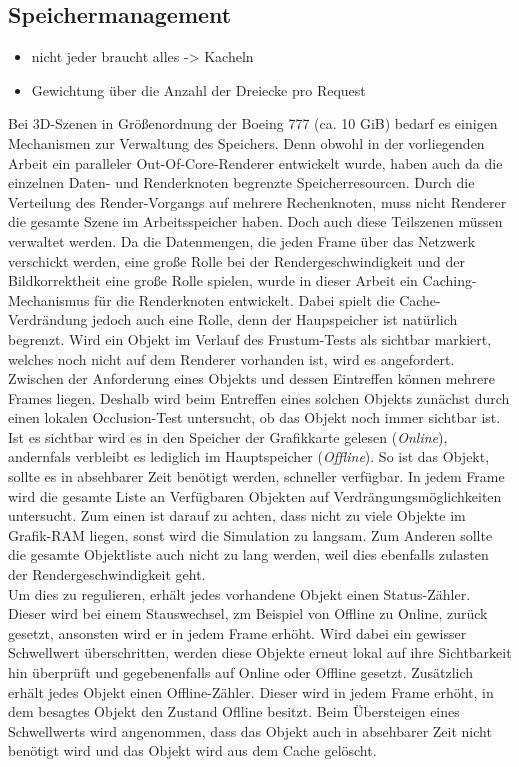 \subsection{Speichermanagement}
\label{sec:basics:speicher}
\begin{itemize}
 \item nicht jeder braucht alles -> Kacheln
 \item Gewichtung über die Anzahl der Dreiecke pro Request
\end{itemize}
Bei 3D-Szenen in Größenordnung der Boeing 777 (ca. 10 GiB) bedarf es einigen Mechanismen zur Verwaltung des Speichers. Denn obwohl in der vorliegenden Arbeit ein paralleler Out-Of-Core-Renderer entwickelt wurde, haben auch da die einzelnen Daten- und Renderknoten begrenzte Speicherresourcen. Durch die Verteilung des Render-Vorgangs auf mehrere Rechenknoten, muss nicht Renderer die gesamte Szene im Arbeitsspeicher haben. Doch auch diese Teilszenen müssen verwaltet werden. Da die Datenmengen, die jeden Frame über das Netzwerk verschickt werden, eine große Rolle bei der Rendergeschwindigkeit und der Bildkorrektheit eine große Rolle spielen, wurde in dieser Arbeit ein Caching-Mechanismus für die Renderknoten entwickelt. Dabei spielt die Cache-Verdrändung jedoch auch eine Rolle, denn der Haupspeicher ist natürlich begrenzt. Wird ein Objekt im Verlauf des Frustum-Tests als sichtbar markiert, welches noch nicht auf dem Renderer vorhanden ist, wird es angefordert. Zwischen der Anforderung eines Objekts und dessen Eintreffen können mehrere Frames liegen. Deshalb wird beim Entreffen eines solchen Objekts zunächst durch einen lokalen Occlusion-Test untersucht, ob das Objekt noch immer sichtbar ist. Ist es sichtbar wird es in den Speicher der Grafikkarte gelesen (\textit{Online}), andernfals verbleibt es lediglich im Hauptspeicher (\textit{Offline}). So ist das Objekt, sollte es in absehbarer Zeit benötigt werden, schneller verfügbar. In jedem Frame wird die gesamte Liste an Verfügbaren Objekten auf Verdrängungsmöglichkeiten untersucht. Zum einen ist darauf zu achten, dass nicht zu viele Objekte im Grafik-RAM liegen, sonst wird die Simulation zu langsam. Zum Anderen sollte die gesamte Objektliste auch nicht zu lang werden, weil dies ebenfalls zulasten der Rendergeschwindigkeit geht.\\
Um dies zu regulieren, erhält jedes vorhandene Objekt einen Status-Zähler. Dieser wird bei einem Stauswechsel, zm Beispiel von Offline zu Online, zurück gesetzt, ansonsten wird er in jedem Frame erhöht. Wird dabei ein gewisser Schwellwert überschritten, werden diese Objekte erneut lokal auf ihre Sichtbarkeit hin überprüft und gegebenenfalls auf Online oder Offline gesetzt. Zusätzlich erhält jedes Objekt einen Offline-Zähler. Dieser wird in jedem Frame erhöht, in dem besagtes Objekt den Zustand Oflline besitzt. Beim Übersteigen eines Schwellwerts wird angenommen, dass das Objekt auch in absehbarer Zeit nicht benötigt wird und das Objekt wird aus dem Cache gelöscht.
